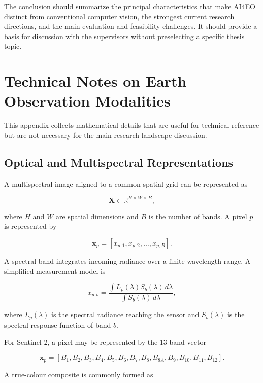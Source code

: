 \documentclass[
    11pt,
    a4paper,
    parskip=half,
    bibliography=totoc,
    numbers=noenddot
]{scrartcl}
\begin{document}
The conclusion should summarize the principal characteristics that make
AI4EO distinct from conventional computer vision, the strongest current
research directions, and the main evaluation and feasibility challenges.
It should provide a basis for discussion with the supervisors without
preselecting a specific thesis topic.


\clearpage
\appendix
{}

\section{Technical Notes on Earth Observation Modalities}
\label{app:eo-technical}

This appendix collects mathematical details that are useful for technical
reference but are not necessary for the main research-landscape
discussion.

\subsection{Optical and Multispectral Representations}

A multispectral image aligned to a common spatial grid can be represented
as

\[
\mathbf{X}\in\mathbb{R}^{H\times W\times B},
\]

where \(H\) and \(W\) are spatial dimensions and \(B\) is the number of
bands. A pixel \(p\) is represented by

\[
\mathbf{x}_p =
\left[
x_{p,1},
x_{p,2},
\ldots,
x_{p,B}
\right].
\]

A spectral band integrates incoming radiance over a finite wavelength
range. A simplified measurement model is

\[
x_{p,b}
=
\frac{
    \int L_p(\lambda)S_b(\lambda)\,d\lambda
}{
    \int S_b(\lambda)\,d\lambda
},
\]

where \(L_p(\lambda)\) is the spectral radiance reaching the sensor and
\(S_b(\lambda)\) is the spectral response function of band \(b\).

For Sentinel-2, a pixel may be represented by the 13-band vector

\[
\mathbf{x}_p =
\left[
B_1,B_2,B_3,B_4,B_5,B_6,B_7,B_8,B_{8A},B_9,B_{10},B_{11},B_{12}
\right].
\]

A true-colour composite is commonly formed as
\end{document}

